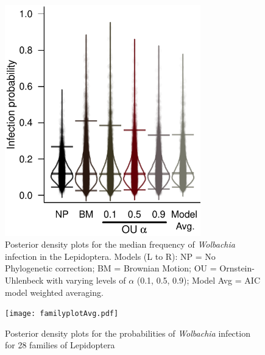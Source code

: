 \documentclass{frontiersSCNS} %
\begin{document}
\begin{figure}[h!]
  \begin{center}
    \includegraphics[width=85mm]{infection_Prob.pdf}
    \caption{Posterior density plots for the median frequency of \textit{Wolbachia} infection in the Lepidoptera. Models (L to R): NP = No Phylogenetic correction; BM = Brownian Motion; OU = Ornstein-Uhlenbeck with varying levels of $\alpha$ (0.1, 0.5, 0.9); Model Avg = AIC model weighted averaging.}
 \label{grand}
  \end{center}
\end{figure}


\begin{figure}[h!]
  \begin{center}
    \texttt{[image: familyplotAvg.pdf]}
    \caption{Posterior density plots for the probabilities of \emph{Wolbachia} infection for 28 families of Lepidoptera}
 \label{familyplot}
  \end{center}
\end{figure}






\end{document}
